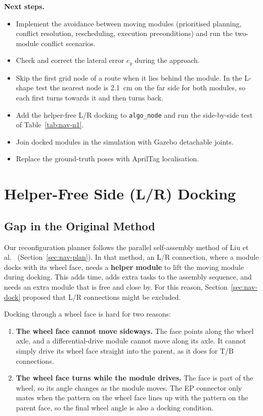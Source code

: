 \documentclass[12pt,a4paper]{article}
\begin{document}
\textbf{Next steps.}
\begin{itemize}[topsep=2pt,itemsep=2pt,parsep=0pt,beginpenalty=10000]
\item Implement the avoidance between moving modules (prioritised planning, conflict resolution, rescheduling, execution preconditions) and run the two-module conflict scenarios.
\item Check and correct the lateral error $e_y$ during the approach.
\item Skip the first grid node of a route when it lies behind the module. In the L-shape test the nearest node is \SI{2.1}{cm} on the far side for both modules, so each first turns towards it and then turns back.
\item Add the helper-free L/R docking to \texttt{algo\_node} and run the side-by-side test of Table~\ref{tab:nav-n1}.
\item Join docked modules in the simulation with Gazebo detachable joints.
\item Replace the ground-truth poses with AprilTag localisation.
\end{itemize}

\clearpage
\section{Helper-Free Side (L/R) Docking}
\label{sec:side-docking}

\subsection{Gap in the Original Method}

Our reconfiguration planner follows the parallel self-assembly method of Liu et al.\ \cite{liu2023} (Section~\ref{sec:nav-plan}). In that method, an L/R connection, where a module docks with its wheel face, needs a \textbf{helper module} to lift the moving module during docking. This adds time, adds extra tasks to the assembly sequence, and needs an extra module that is free and close by. For this reason, Section~\ref{sec:nav-dock} proposed that L/R connections might be excluded.

Docking through a wheel face is hard for two reasons:

\begin{enumerate}[topsep=2pt,itemsep=2pt,parsep=0pt,leftmargin=1.5em]
\item \textbf{The wheel face cannot move sideways.} The face points along the wheel axle, and a differential-drive module cannot move along its axle. It cannot simply drive its wheel face straight into the parent, as it does for T/B connections.
\item \textbf{The wheel face turns while the module drives.} The face is part of the wheel, so its angle changes as the module moves. The EP connector only mates when the pattern on the wheel face lines up with the pattern on the parent face, so the final wheel angle is also a docking condition.
\end{enumerate}
\end{document}
